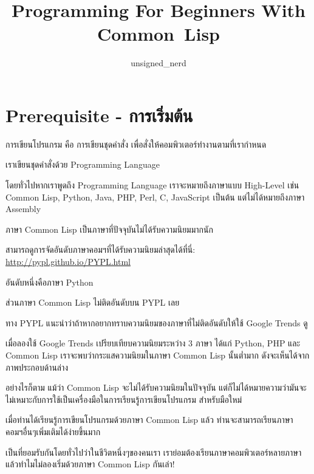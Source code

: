 \documentclass[a4paper]{article}
\begin{document}
\title{Programming For Beginners With Common~Lisp}
\author{unsigned\_nerd}
\maketitle

\tableofcontents

\section{Prerequisite - การเริ่มต้น}

การเขียนโปรแกรม คือ การเขียนชุดคำสั่ง เพื่อสั่งให้คอมพิวเตอร์ทำงานตามที่เรากำหนด

เราเขียนชุดคำสั่งด้วย Programming Language

โดยทั่วไปหากเราพูดถึง Programming Language เราจะหมายถึงภาษาแบบ High-Level เช่น
Common Lisp, Python, Java, PHP, Perl, C, JavaScript เป็นต้น
แต่ไม่ได้หมายถึงภาษา Assembly

ภาษา Common Lisp เป็นภาษาที่ปัจจุบันไม่ได้รับความนิยมมากนัก

สามารถดูการจัดอันดับภาษาคอมฯที่ได้รับความนิยมล่าสุดได้ที่นี่: \href{http://pypl.github.io/PYPL.html}{http://pypl.github.io/PYPL.html}

อันดับหนึ่งคือภาษา Python

ส่วนภาษา Common Lisp ไม่ติดอันดับบน PYPL เลย

ทาง PYPL แนะนำว่าถ้าหากอยากทราบความนิยมของภาษาที่ไม่ติดอันดับให้ใช้ Google Trends ดู

เมื่อลองใช้ Google Trends เปรียบเทียบความนิยมระหว่าง 3 ภาษา ได้แก่ Python, PHP
และ Common Lisp เราจะพบว่ากระแสความนิยมในภาษา Common Lisp นั้นต่ำมาก
ดังจะเห็นได้จากภาพประกอบด้านล่าง


อย่างไรก็ตาม แม้ว่า Common Lisp จะไม่ได้รับความนิยมในปัจจุบัน
แต่ก็ไม่ได้หมายความว่ามันจะไม่เหมาะกับการใช้เป็นเครื่องมือในการเรียนรู้การเขียนโปรแกรม%
สำหรับมือใหม่

เมื่อท่านได้เรียนรู้การเขียนโปรแกรมด้วยภาษา Common Lisp แล้ว ท่านจะสามารถเรียนภาษา%
คอมฯอื่นๆเพิ่มเติมได้ง่ายขึ้นมาก

เป็นที่ยอมรับกันโดยทั่วไปว่าในชีวิตหนึ่งๆของคนเรา เราย่อมต้องเรียนภาษาคอมพิวเตอร์หลายภาษา
แล้วทำไมไม่ลองเริ่มด้วยภาษา Common Lisp กันเล่า!

\end{document}
